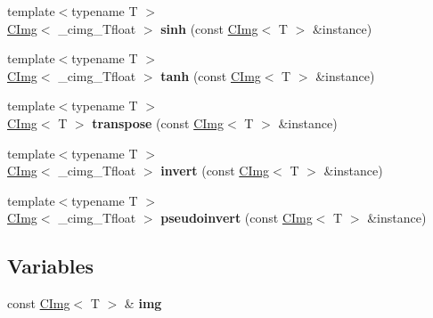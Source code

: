 \begin{DoxyCompactItemize}
\item 
\mbox{\label{namespacecimg__library__suffixed_a127032338ec3d45d05003b969a4b9edc}} 
{\footnotesize template$<$typename T $>$ }\\\hyperlink{structcimg__library__suffixed_1_1CImg}{C\+Img}$<$ \+\_\+cimg\+\_\+\+Tfloat $>$ {\bfseries sinh} (const \hyperlink{structcimg__library__suffixed_1_1CImg}{C\+Img}$<$ T $>$ \&instance)
\item 
\mbox{\label{namespacecimg__library__suffixed_a225d9830c3a7df2c78c3bce4f3258f8d}} 
{\footnotesize template$<$typename T $>$ }\\\hyperlink{structcimg__library__suffixed_1_1CImg}{C\+Img}$<$ \+\_\+cimg\+\_\+\+Tfloat $>$ {\bfseries tanh} (const \hyperlink{structcimg__library__suffixed_1_1CImg}{C\+Img}$<$ T $>$ \&instance)
\item 
\mbox{\label{namespacecimg__library__suffixed_a48465f36a81f510ce3368f0e0200532e}} 
{\footnotesize template$<$typename T $>$ }\\\hyperlink{structcimg__library__suffixed_1_1CImg}{C\+Img}$<$ T $>$ {\bfseries transpose} (const \hyperlink{structcimg__library__suffixed_1_1CImg}{C\+Img}$<$ T $>$ \&instance)
\item 
\mbox{\label{namespacecimg__library__suffixed_a78492a52daecbec968b15f3c02f3fdde}} 
{\footnotesize template$<$typename T $>$ }\\\hyperlink{structcimg__library__suffixed_1_1CImg}{C\+Img}$<$ \+\_\+cimg\+\_\+\+Tfloat $>$ {\bfseries invert} (const \hyperlink{structcimg__library__suffixed_1_1CImg}{C\+Img}$<$ T $>$ \&instance)
\item 
\mbox{\label{namespacecimg__library__suffixed_aa2cd51ec8b416d2ca4299253e618d343}} 
{\footnotesize template$<$typename T $>$ }\\\hyperlink{structcimg__library__suffixed_1_1CImg}{C\+Img}$<$ \+\_\+cimg\+\_\+\+Tfloat $>$ {\bfseries pseudoinvert} (const \hyperlink{structcimg__library__suffixed_1_1CImg}{C\+Img}$<$ T $>$ \&instance)
\end{DoxyCompactItemize}
\subsection*{Variables}
\begin{DoxyCompactItemize}
\item 
const \hyperlink{structcimg__library__suffixed_1_1CImg}{C\+Img}$<$ T $>$ \& {\bfseries img}
\end{DoxyCompactItemize}



